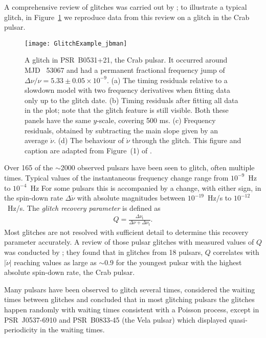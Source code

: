 A comprehensive review of glitches was carried out by
\citet{Espinoza2011}; to illustrate a typical glitch, in Figure~\ref{fig: glitch}
we reproduce data from this review on a glitch in the Crab pulsar.
\begin{figure}[htb]
    \centering
    \texttt{[image: GlitchExample\_jbman]}
    \caption{
A glitch in PSR~B0531+21, the Crab pulsar. It occurred around MJD\protect\footnotemark
~53067 and had a permanent fractional frequency jump of $\Delta\nu/\nu = 5.33 \pm 0.05
{\times}10^{-9}$. (a) The timing residuals relative to a
slowdown model with two frequency derivatives when fitting data only up to the
glitch date. (b) Timing residuals after fitting all data in the plot; note
that the glitch feature is still visible. Both these panels have the same
$y$-scale, covering 500 ms. (c) Frequency residuals, obtained by subtracting the
main slope given by an average $\dot\nu$. (d) The behaviour of $\dot\nu$
through the glitch. This figure and caption are adapted from Figure~(1) of
\citet{Espinoza2011}.}
    \label{fig: glitch}
\end{figure}

Over 165 of the $\sim$2000 observed pulsars have been seen to glitch, often multiple
times. Typical values of the instantaneous frequency change range from
$10^{-9}$~Hz to $10^{-4}$~Hz For some pulsars this is accompanied by a change,
with either sign, in the spin-down rate $\Delta\dot{\nu}$ with absolute
magnitudes between $10^{-19}$~Hz/s to $10^{-12}$~Hz/s.
The \emph{glitch recovery parameter} is defined as
\begin{align}
Q = \frac{\Delta\nu_\textrm{t}}{\Delta\nu + \Delta\nu_\textrm{t}}.
\end{align}
Most glitches are not resolved with sufficient detail to determine this
recovery parameter accurately. A review of those pulsar glitches with measured
values of $Q$ was conducted by \citet{Lyne2000}; they found that in glitches
from 18 pulsars, $Q$ correlates with $|\dot{\nu}|$ reaching values as large as
$\sim0.9$ for the youngest pulsar with the highest absolute spin-down rate, the
Crab pulsar.

Many pulsars have been observed to glitch several times, \citet{Melatos2008}
considered the waiting times between glitches and concluded that in most
glitching pulsars the glitches happen randomly with waiting times consistent
with a Poisson process, except in PSR~J0537-6910 and PSR~B0833-45 (the Vela
pulsar) which displayed quasi-periodicity in the waiting times.

